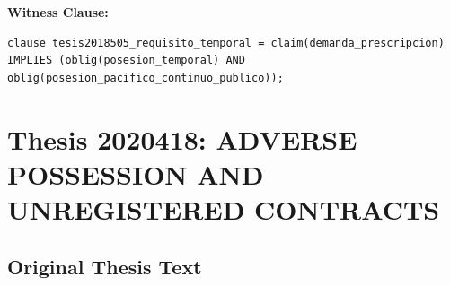 \documentclass[11pt,a4paper]{article}
\begin{document}
\textbf{Witness Clause:}

\begin{lstlisting}[style=witnessstyle, language=Witness]
clause tesis2018505_requisito_temporal = claim(demanda_prescripcion) IMPLIES (oblig(posesion_temporal) AND oblig(posesion_pacifico_continuo_publico));
\end{lstlisting}

\newpage

\section{Thesis 2020418: ADVERSE POSSESSION AND UNREGISTERED CONTRACTS}
\label{thesis:2020418}

\subsection{Original Thesis Text}
\end{document}
